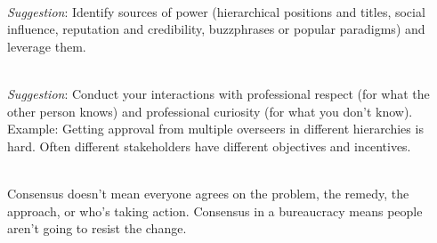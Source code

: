 \ \\
\textit{Suggestion}: Identify sources of power (hierarchical positions and titles, social influence, reputation and credibility, buzzphrases or popular paradigms) and leverage them.

\ \\
\textit{Suggestion}: Conduct your interactions with professional respect (for what the other person knows) and professional curiosity (for what you don't know). \\
Example: Getting approval from multiple overseers in different hierarchies is hard. Often different stakeholders have different objectives and incentives.



\ \\
Consensus doesn't mean everyone agrees on the problem, the remedy, the approach, or who's taking action. Consensus in a bureaucracy means people aren't going to resist the change.